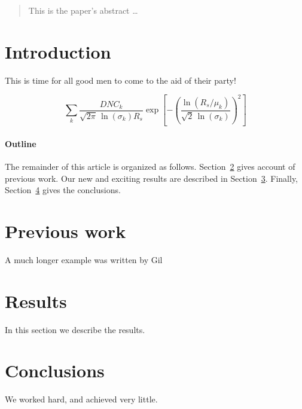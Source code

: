 \documentclass[12pt]{article}
\begin{document}
\maketitle

\begin{abstract}
This is the paper's abstract \ldots
\end{abstract}

\section{Introduction}
This is time for all good men to come to the aid of their party!

\begin{equation}
\sum_k \frac{DNC_k}{\sqrt{2 \pi} \, \ln (\sigma_k) R_s}
\exp [ -(\frac{\ln (R_s / \mu_k)}{\sqrt{2} \, \ln (\sigma_k)} )^2 ]
\end{equation}

\paragraph{Outline}
The remainder of this article is organized as follows.
Section~\ref{previous work} gives account of previous work.
Our new and exciting results are described in Section~\ref{results}.
Finally, Section~\ref{conclusions} gives the conclusions.

\section{Previous work}\label{previous work}
A much longer \LaTeXe{} example was written by Gil

\section{Results}\label{results}
In this section we describe the results.

\section{Conclusions}\label{conclusions}
We worked hard, and achieved very little.



\end{document}
